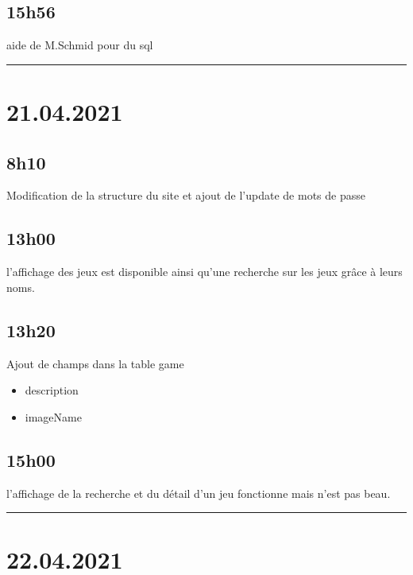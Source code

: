 \documentclass[a4paper,12pt,french]{sphinxmanual}
\begin{document}
\subsection{15h56}
\label{\detokenize{logbook:h56}}
\sphinxAtStartPar
aide de M.Schmid pour du sql


\bigskip\hrule\bigskip



\section{21.04.2021}
\label{\detokenize{logbook:id10}}

\subsection{8h10}
\label{\detokenize{logbook:h10}}
\sphinxAtStartPar
Modification de la structure du site et ajout de l’update de mots de passe


\subsection{13h00}
\label{\detokenize{logbook:h00}}
\sphinxAtStartPar
l’affichage des jeux est disponible ainsi qu’une recherche sur les jeux grâce à leurs noms.


\subsection{13h20}
\label{\detokenize{logbook:id11}}
\sphinxAtStartPar
Ajout de champs dans la table game
\begin{itemize}
\item {} 
\sphinxAtStartPar
description

\item {} 
\sphinxAtStartPar
imageName

\end{itemize}


\subsection{15h00}
\label{\detokenize{logbook:id12}}
\sphinxAtStartPar
l’affichage de la recherche et du détail d’un jeu fonctionne mais n’est pas beau.


\bigskip\hrule\bigskip



\section{22.04.2021}
\label{\detokenize{logbook:id13}}
\end{document}

